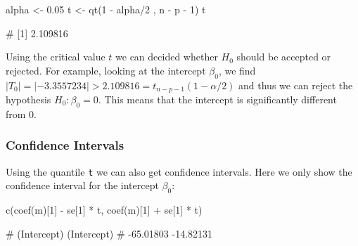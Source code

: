 \documentclass[
  a4paper,
]{article}
\newenvironment{Shaded}{\begin{snugshade}}{\end{snugshade}}
\newcommand{\DecValTok}[1]{\textcolor[rgb]{0.00,0.00,0.81}{#1}}
\newcommand{\FloatTok}[1]{\textcolor[rgb]{0.00,0.00,0.81}{#1}}
\newcommand{\FunctionTok}[1]{\textcolor[rgb]{0.00,0.00,0.00}{#1}}
\newcommand{\NormalTok}[1]{#1}
\newcommand{\OtherTok}[1]{\textcolor[rgb]{0.56,0.35,0.01}{#1}}
\newcommand{\SpecialCharTok}[1]{\textcolor[rgb]{0.00,0.00,0.00}{#1}}
\theoremstyle{definition}
\theoremstyle{definition}
\theoremstyle{definition}
\theoremstyle{definition}
\theoremstyle{remark}
\begin{document}
\begin{Shaded}
\begin{Highlighting}[]
\NormalTok{alpha }\OtherTok{\textless{}{-}} \FloatTok{0.05}
\NormalTok{t }\OtherTok{\textless{}{-}} \FunctionTok{qt}\NormalTok{(}\DecValTok{1} \SpecialCharTok{{-}}\NormalTok{ alpha}\SpecialCharTok{/}\DecValTok{2}\NormalTok{ , n }\SpecialCharTok{{-}}\NormalTok{ p }\SpecialCharTok{{-}} \DecValTok{1}\NormalTok{)}
\NormalTok{t}
\end{Highlighting}
\end{Shaded}

\begin{Shaded}
\begin{Highlighting}[]
\NormalTok{\# [1] 2.109816}
\end{Highlighting}
\end{Shaded}

Using the critical value \(t\) we can decided whether \(H_0\) should be accepted or
rejected. For example, looking at the intercept \(\beta_0\), we find \(|T_0| = |-3.3557234| > 2.109816 = t_{n-p-1}(1-\alpha/2)\) and thus we can reject the
hypothesis \(H_0\colon \beta_0 = 0\). This means that the intercept is
significantly different from 0.

\hypertarget{confidence-intervals-1}{%
\subsubsection{Confidence Intervals}\label{confidence-intervals-1}}

Using the quantile \texttt{t} we can also get confidence intervals. Here we
only show the confidence interval for the intercept \(\beta_0\):

\begin{Shaded}
\begin{Highlighting}[]
\FunctionTok{c}\NormalTok{(}\FunctionTok{coef}\NormalTok{(m)[}\DecValTok{1}\NormalTok{] }\SpecialCharTok{{-}}\NormalTok{ se[}\DecValTok{1}\NormalTok{] }\SpecialCharTok{*}\NormalTok{ t, }\FunctionTok{coef}\NormalTok{(m)[}\DecValTok{1}\NormalTok{] }\SpecialCharTok{+}\NormalTok{ se[}\DecValTok{1}\NormalTok{] }\SpecialCharTok{*}\NormalTok{ t)}
\end{Highlighting}
\end{Shaded}

\begin{Shaded}
\begin{Highlighting}[]
\NormalTok{\# (Intercept) (Intercept) }
\NormalTok{\#   {-}65.01803   {-}14.82131}
\end{Highlighting}
\end{Shaded}
\end{document}
